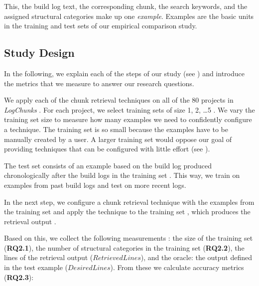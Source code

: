 This, the build log text, the corresponding chunk,
the search keywords, and the assigned structural categories
make up one \emph{example}.
Examples are the basic units in the training and test sets of our
empirical comparison study.

\subsection{Study Design}

In the following, we explain each of the steps of our study
(see )
and introduce the metrics that
we measure to answer our research questions.

We apply each of the chunk retrieval techniques
on all of the 80 projects in
\emph{LogChunks} .
For each project, we select training sets of size 1, 2, \dots 5
.
We vary the training set size to measure how many examples we need to
confidently configure a technique.
The training set is so small because the examples have to be
manually created by a user.
A larger training set would oppose our goal of providing techniques
that can be configured with little effort
(see ).

The test set consists of an example based on the build log produced
chronologically after the build logs in the training set .
This way, we train on examples from past build logs and test on
more recent logs.

In the next step, we configure a chunk retrieval technique with
the examples from the training set  and apply the technique
to the
training set , which produces the retrieval output
.

Based on this, we collect the following measurements :
the size of the training set (\textbf{RQ2.1}),
the number of structural categories in the training
set (\textbf{RQ2.2}),
the lines of the retrieval output ($\mathit{RetrievedLines}$),
and the oracle: the output defined in the test example
($\mathit{DesiredLines}$).
From these we calculate accuracy metrics (\textbf{RQ2.3}):

